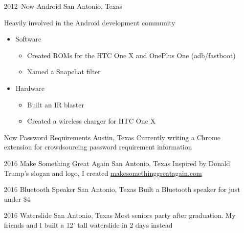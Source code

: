 \documentclass[]{friggeri-cv} %
\begin{document}
\begin{entrylist}

	\entry
	{2012--Now}
	{Android}
	{San Antonio, Texas}
	{Heavily involved in the Android development community
		\begin{itemize}
			\item Software
				\begin{itemize}
					\item Created ROMs for the HTC One X and OnePlus One (adb/fastboot)
					\item Named a Snapchat filter
				\end{itemize}
			\item Hardware
				\begin{itemize}
					\item Built an IR blaster
					\item Created a wireless charger for HTC One X
				\end{itemize}
		\end{itemize}
	}


	\entry
	{Now}
	{Password Requirements}
	{Austin, Texas}
	{Currently writing a Chrome extension for crowdsourcing password requirement information}


	\entry
	{2016}
	{Make Something Great Again}
	{San Antonio, Texas}
	{Inspired by Donald Trump's slogan and logo, I created \href{http://makesomethinggreatagain.com}{makesomethinggreatagain.com}}


	\entry
	{2016}
	{Bluetooth Speaker}
	{San Antonio, Texas}
	{Built a Bluetooth speaker for just under \$4}


	\entry
	{2016}
	{Waterslide}
	{San Antonio, Texas}
	{Most seniors party after graduation. My friends and I built a 12' tall waterslide in 2 days instead}


\end{entrylist}
\end{document}
